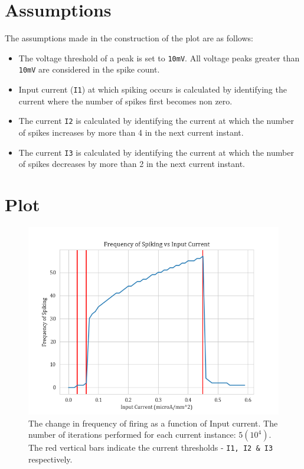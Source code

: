 \documentclass[12pt,a4paper]{article}
\def\tt#1{\texttt{#1}}
\begin{document}
\section{Assumptions}
The assumptions made in the construction of the plot are as follows:
\begin{itemize}
	\itemsep0em
	\item The voltage threshold of a peak is set to \tt{10mV}. All voltage peaks greater than \tt{10mV} are considered in the spike count.
	\item Input current (\tt{I1}) at which spiking occurs is calculated by identifying the current where the number of spikes first becomes non zero.
	\item The current \tt{I2} is calculated by identifying the current at which  the number of spikes increases by more than 4 in the next current instant.
	\item The current \tt{I3} is calculated by identifying the current at which  the number of spikes decreases by more than 2 in the next current instant.
\end{itemize}

\section{Plot}
\vspace{-1em}
\begin{figure}[H]
	\centering
	\includegraphics[scale=0.6]{images/frequency.png}
	\caption{The change in frequency of firing as a function of Input current. The number of iterations performed for each current instance: $5(10^4)$. The red vertical bars indicate the current thresholds - \tt{I1, I2 \& I3} respectively.}
\end{figure}
\end{document}
